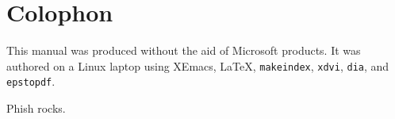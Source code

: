 %
%

\chapter{Colophon}

This manual was produced without the aid of Microsoft products.
It was authored on a Linux laptop using XEmacs, \LaTeX{},
\texttt{makeindex}, \texttt{xdvi}, \texttt{dia}, and \texttt{epstopdf}.

\rule{0pt}{17em}

\begin{flushright}
Phish rocks.
\end{flushright}
